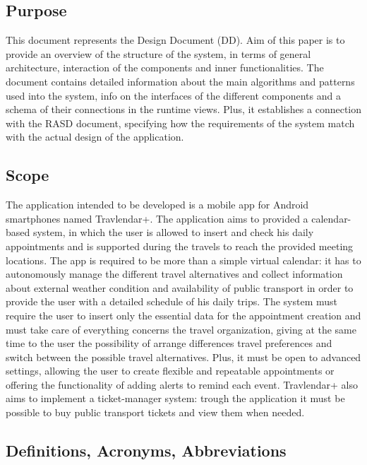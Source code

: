 \subsection{Purpose}
This document represents the Design Document (DD). Aim of this paper is to provide an overview of the structure of the system, in terms of general architecture, interaction of the components and inner functionalities. The document contains detailed information about the main algorithms and patterns used into the system, info on the interfaces of the different components and a schema of their connections in the runtime views. Plus, it establishes a connection with the RASD document, specifying how the requirements of the system match with the actual design of the application. 

\subsection{Scope}
The application intended to be developed is a mobile app for Android smartphones named Travlendar+.
The application aims to provided a calendar-based system, in which the user is allowed to insert and
check his daily appointments and is supported during the travels to reach the provided meeting locations.
The app is required to be more than a simple virtual calendar: it has to autonomously manage the different
travel alternatives and collect information about external weather condition and availability of public
transport in order to provide the user with a detailed schedule of his daily trips. The system must require
the user to insert only the essential data for the appointment creation and must take care of everything
concerns the travel organization, giving at the same time to the user the possibility of arrange differences
travel preferences and switch between the possible travel alternatives. Plus, it must be open to advanced
settings, allowing the user to create flexible and repeatable appointments or offering the functionality of
adding alerts to remind each event. Travlendar+ also aims to implement a ticket-manager system: trough
the application it must be possible to buy public transport tickets and view them when needed.

\subsection{Definitions, Acronyms, Abbreviations}
